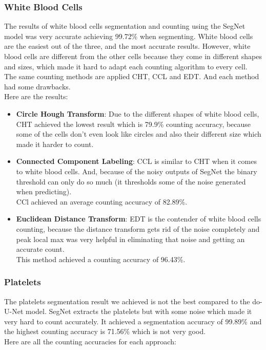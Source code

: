 \documentclass[conference]{IEEEtran}
\begin{document}
\subsubsection{White Blood Cells}
\hspace{\parindent}
The results of white blood cells segmentation and counting using the SegNet model was very accurate achieving 99.72\% when segmenting.
White blood cells are the easiest out of the three, and the most accurate results.
However, white blood cells are different from the other cells because they come in different shapes and sizes, which made it hard to adapt each counting algorithm to every cell.\\
The same counting methods are applied CHT, CCL and EDT. And each method had some drawbacks.\\
Here are the results:
\begin{itemize}
  \item \textbf{Circle Hough Transform}: Due to the different shapes of white blood cells, CHT achieved the lowest result which is 79.9\% counting accuracy, because some of the cells don't even look like circles and also their different size which made it harder to count.
  \item \textbf{Connected Component Labeling}: CCL is similar to CHT when it comes to white blood cells. And, because of the noisy outputs of SegNet the binary threshold can only do so much (it thresholds some of the noise generated when predicting).\\
    CCl achieved an average counting accuracy of 82.89\%.
  \item \textbf{Euclidean Distance Transform}: EDT is the contender of white blood cells counting, because the distance transform gets rid of the noise completely and peak local max was very helpful in eliminating that noise and getting an accurate count.\\
    This method achieved a counting accuracy of 96.43\%.
\end{itemize}

\subsubsection{Platelets}
\hspace{\parindent}
The platelets segmentation result we achieved is not the best compared to the do-U-Net model. SegNet extracts the platelets but with some noise which made it very hard to count accurately.
It achieved a segmentation accuracy of 99.89\% and the highest counting accuracy is 71.56\% which is not very good.\\
Here are all the counting accuracies for each approach:
\end{document}
